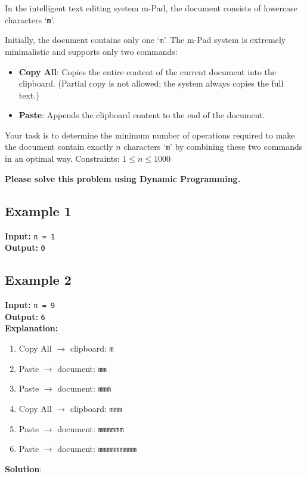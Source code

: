 \problem{}

\par In the intelligent text editing system m-Pad, the document consists of lowercase characters `\texttt{m}'.  
\par Initially, the document contains only one `\texttt{m}'. The m-Pad system is extremely minimalistic and supports only two commands:
\begin{itemize}
    \item \textbf{Copy All}: Copies the entire content of the current document into the clipboard.  
    (Partial copy is not allowed; the system always copies the full text.)
    \item \textbf{Paste}: Appends the clipboard content to the end of the document.
\end{itemize}
\par Your task is to determine the minimum number of operations required to make the document contain exactly $n$ characters `\texttt{m}' by combining these two commands in an optimal way. Constraints: $1 \leq n \leq 1000$
\par \textbf{Please solve this problem using Dynamic Programming.}

\subsection*{Example 1}

\textbf{Input:} \texttt{n = 1} \\
\textbf{Output:} \texttt{0}

\subsection*{Example 2}

\textbf{Input:} \texttt{n = 9} \\
\textbf{Output:} \texttt{6} \\
\textbf{Explanation:}
\begin{enumerate}
    \item Copy All $\rightarrow$ clipboard: \texttt{m}
    \item Paste $\rightarrow$ document: \texttt{mm}
    \item Paste $\rightarrow$ document: \texttt{mmm}
    \item Copy All $\rightarrow$ clipboard: \texttt{mmm}
    \item Paste $\rightarrow$ document: \texttt{mmmmmm}
    \item Paste $\rightarrow$ document: \texttt{mmmmmmmmm}
\end{enumerate}
\newpage
\noindent \textbf{Solution}:


